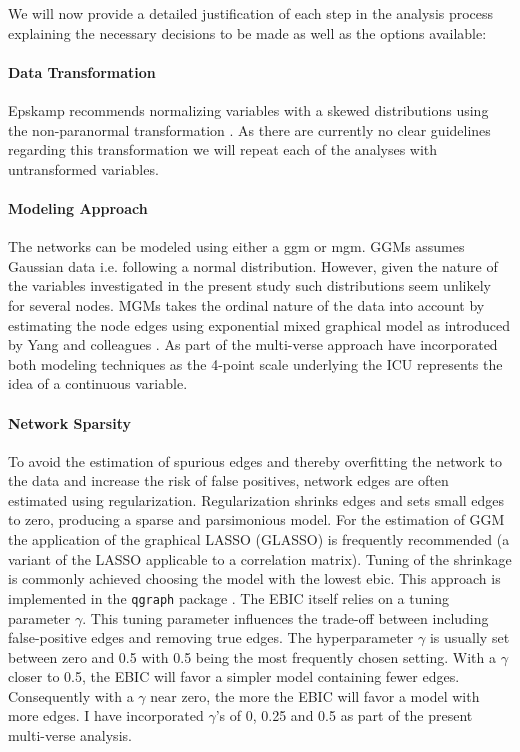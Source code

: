 \documentclass[a4paper,12pt]{article} %
\begin{document}
		We will now  provide a detailed justification of each step in the analysis process explaining the necessary decisions to be made as well as the options available:

		\paragraph{Data Transformation}
		Epskamp \parencite*{epskamp_estimating_2018} recommends normalizing variables with a skewed distributions using the non-paranormal transformation \parencite{liu_nonparanormal_2009}.
		As there are currently no clear guidelines regarding this transformation we will repeat each of the analyses with untransformed variables. %

\paragraph{Modeling Approach}
		The networks can be modeled using either a \gls{ggm}  or \gls{mgm}.
		GGMs assumes Gaussian data i.e. following a normal distribution.
		However, given the nature of the variables investigated in the present study such distributions seem unlikely for several nodes.
		MGMs takes the ordinal nature of the data into account by estimating the node edges using exponential mixed graphical model as introduced by Yang and colleagues \parencite*{yang_mixed_2014}. 
		As part of the multi-verse approach have incorporated both modeling techniques as the 4-point scale underlying the ICU represents the idea of a continuous variable.

		\paragraph{Network Sparsity} To avoid the estimation of spurious edges and thereby overfitting the network to the data and increase the risk of false positives, network edges are often estimated using regularization.
		Regularization shrinks edges and sets small edges to zero, producing a sparse and parsimonious model.
		For the estimation of GGM the application of the graphical LASSO (GLASSO) is frequently recommended (a variant of the LASSO applicable to a correlation matrix).
		Tuning of the shrinkage is commonly achieved choosing the model with the lowest  \gls{ebic}.
		This approach is implemented in the \texttt{qgraph} package \parencite{epskamp_qgraph_2012}.
		The EBIC itself relies on a tuning parameter $\gamma$.
		This tuning parameter influences the trade-off between including false-positive edges and removing true edges.
		The hyperparameter $\gamma$ is usually set between zero and 0.5 \parencite{epskamp_tutorial_2018} with 0.5 being the most frequently chosen setting.
		With a $\gamma$ closer to 0.5, the EBIC will favor a simpler model containing fewer edges.
		Consequently with a $\gamma$ near zero, the more the EBIC will favor a model with more edges.
		I have incorporated $\gamma$'s of 0, 0.25 and 0.5 as part of the present multi-verse analysis.
\end{document}
